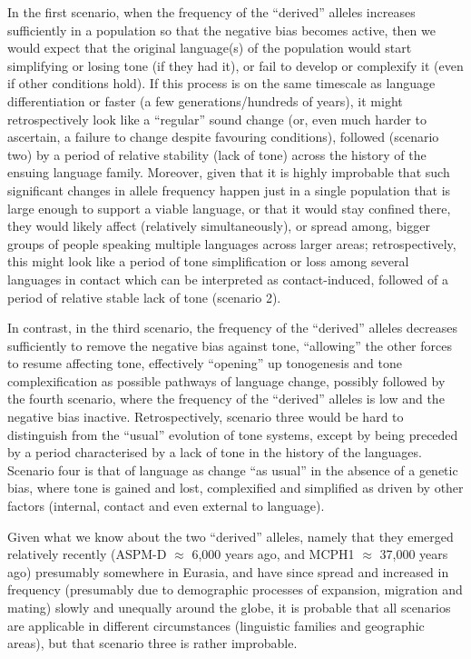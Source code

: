 \documentclass[twoside,twocolumn]{article}
\begin{document}
In the first scenario, when the frequency of the ``derived'' alleles increases sufficiently in a population so that the negative bias becomes active, then we would expect that the original language(s) of the population would start simplifying or losing tone (if they had it), or fail to develop or complexify it (even if other conditions hold).
If this process is on the same timescale as language differentiation or faster (a few generations/hundreds of years), it might retrospectively look like a ``regular'' sound change (or, even much harder to ascertain, a failure to change despite favouring conditions), followed (scenario two) by a period of relative stability (lack of tone) across the history of the ensuing language family.
Moreover, given that it is highly improbable that such significant changes in allele frequency happen just in a single population that is large enough to support a viable language, or that it would stay confined there, they would likely affect (relatively simultaneously), or spread among, bigger groups of people speaking multiple languages across larger areas; retrospectively, this might look like a period of tone simplification or loss among several languages in contact which can be interpreted as contact-induced, followed of a period of relative stable lack of tone (scenario 2).

In contrast, in the third scenario, the frequency of the ``derived'' alleles decreases sufficiently to remove the negative bias against tone, ``allowing'' the other forces to resume affecting tone, effectively ``opening'' up tonogenesis and tone complexification as possible pathways of language change, possibly followed by the fourth scenario, where the frequency of the ``derived'' alleles is low and the negative bias inactive.
Retrospectively, scenario three would be hard to distinguish from the ``usual'' evolution of tone systems, except by being preceded by a period characterised by a lack of tone in the history of the languages.
Scenario four is that of language as change ``as usual'' in the absence of a genetic bias, where tone is gained and lost, complexified and simplified as driven by other factors (internal, contact and even external to language).

Given what we know about the two ``derived'' alleles, namely that they emerged relatively recently (ASPM-D $\approx$ 6,000 years ago, and MCPH1 $\approx$ 37,000 years ago) presumably somewhere in Eurasia, and have since spread and increased in frequency (presumably due to demographic processes of expansion, migration and mating) slowly and unequally around the globe, it is probable that all scenarios are applicable in different circumstances (linguistic families and geographic areas), but that scenario three is rather improbable.
\end{document}
